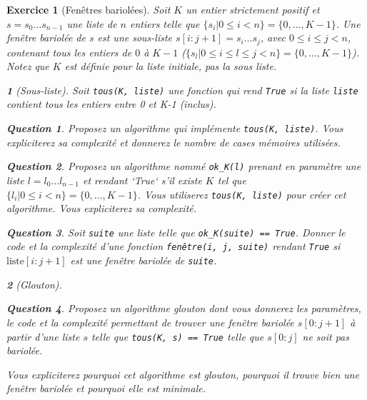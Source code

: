 \documentclass{article}
\theoremstyle{exostyle}
\newtheorem{exo}{Exercice}
\theoremstyle{partiestyle}
\newtheorem{partie}{}[exo]
\theoremstyle{questionstyle}
\newtheorem{questionpartie}{Question}[partie]
\begin{document}
\clearpage
\begin{exo}[Fenêtres bariolées]
 Soit $K$ un entier strictement positif et $s = s_0\dots s_{n-1}$ une liste de $n$ entiers telle que $\{s_i \vert 0\leq i < n \} = \{0, \dots, K-1\}$.
 Une {\it fenêtre bariolée de $s$} est une sous-liste $s[i:j+1] = s_i\dots s_j$, avec $0 \leq i \leq j < n$, contenant tous les entiers de $0$ à $K-1$ ($\{s_l \vert 0\leq i \leq l \leq j < n \} = \{0, \dots, K-1\}$). Notez que $K$ est définie pour la liste initiale, pas la sous liste. 

\begin{partie}[Sous-liste]

Soit \verb`tous(K, liste)` une fonction qui rend \verb`True` si la liste \verb`liste` contient tous les entiers entre 0 et K-1 (inclus).

\begin{questionpartie}
Proposez un algorithme qui implémente \verb`tous(K, liste)`. Vous expliciterez sa complexité et donnerez le nombre de cases mémoires utilisées. 
\end{questionpartie}
\begin{questionpartie}
Proposez un algorithme nommé \verb`ok_K(l)` prenant en paramètre une liste $l=l_0\dots l_{n-1}$ et rendant `True` s'il existe $K$ tel que $\{l_i \vert 0\leq i < n \} = \{0, \dots, K-1\}$. Vous utiliserez \verb`tous(K, liste)` pour créer cet algorithme. 
Vous expliciterez sa complexité. 

\end{questionpartie}

\begin{questionpartie}
    Soit \verb`suite` une liste telle que \verb`ok_K(suite) == True`. Donner le code et la complexité d'une fonction \verb`fenêtre(i, j, suite)` rendant \verb`True` si $\mbox{liste}[i:j+1]$ est une fenêtre bariolée de \verb`suite`.
\end{questionpartie}

\end{partie}

\begin{partie}[Glouton]
\begin{questionpartie}
Proposez un algorithme glouton dont vous donnerez les paramètres, le code et la complexité permettant de trouver une fenêtre bariolée $s[0:j+1]$ à partir d'une liste $s$ telle que \verb`tous(K, s) == True` telle que $s[0:j]$ ne soit pas bariolée.

Vous expliciterez pourquoi cet algorithme est glouton, pourquoi il trouve bien une fenêtre bariolée et pourquoi elle est minimale.
\end{questionpartie}


\end{partie}
\end{exo}
\end{document}
